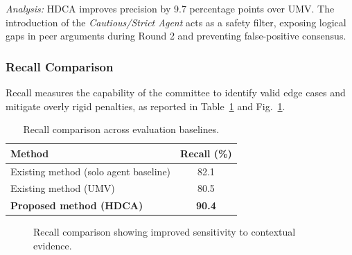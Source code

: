 \documentclass[a4paper,fleqn]{cas-sc}
\begin{document}
\textit{Analysis:} HDCA improves precision by 9.7 percentage points over UMV. The introduction of the \textit{Cautious/Strict Agent} acts as a safety filter, exposing logical gaps in peer arguments during Round 2 and preventing false-positive consensus.

\subsubsection{Recall Comparison}
Recall measures the capability of the committee to identify valid edge cases and mitigate overly rigid penalties, as reported in Table~\ref{tab:recall} and Fig.~\ref{fig:recall_chart}.

\begin{table}[pos=H]
\caption{Recall comparison across evaluation baselines.}
\label{tab:recall}
\centering
\begin{tabular}{lc}
\hline
\textbf{Method} & \textbf{Recall (\%)} \\
\hline
Existing method (solo agent baseline) & 82.1 \\
Existing method (UMV) & 80.5 \\
\textbf{Proposed method (HDCA)} & \textbf{90.4} \\
\hline
\end{tabular}
\end{table}

\begin{figure}[pos=H]
\centering
{}
\caption{Recall comparison showing improved sensitivity to contextual evidence.}
\label{fig:recall_chart}
\end{figure}
\end{document}
